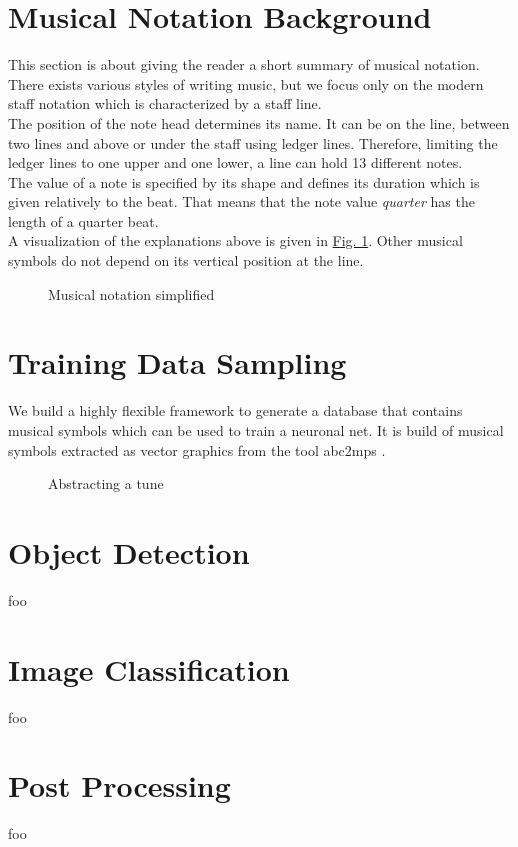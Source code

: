 \documentclass{llncs}
\begin{document}
\section{Musical Notation Background}
This section is about giving the reader a short summary of musical notation. There exists various styles of writing music, but we focus only on the modern staff notation which is characterized by a staff line. \\
The position of the note head determines its name. It can be on the line, between two lines and above or under the staff using ledger lines. Therefore, limiting the ledger lines to one upper and one lower, a line can hold 13 different notes. \\
The value of a note is specified by its shape and defines its duration which is given relatively to the beat. That means that the note value \textit{quarter} has the length of a quarter beat. \\
A visualization of the explanations above is given in \hyperref[musical_notation]{Fig. 1}. 
Other musical symbols do not depend on its vertical position at the line. 


\begin{figure}
 
 \caption{Musical notation simplified}
 \label{musical_notation}
\end{figure}

\section{Training Data Sampling}
We build a highly flexible framework to generate a database that contains musical symbols which can be used to train a neuronal net. It is build of musical symbols extracted as vector graphics from the tool abc2mps \citet{abc2mps}. 


\begin{figure}
 
 \caption{Abstracting a tune} 
\end{figure}

\section{Object Detection}
foo

\section{Image Classification}
foo

\section{Post Processing}
foo

\newpage 


  
\end{document}
